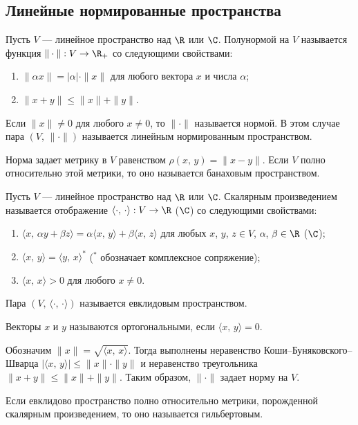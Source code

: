 \documentclass[a4paper
]{article}
\begin{document}
\subsection{Линейные нормированные пространства}
\begin{Def}
Пусть $V$ --- линейное пространство над $\R$ или $\C$. Полунормой
на $V$ называется функция $\|\cdot\|:V\rightarrow \R_+$ со
следующими свойствами:
\begin{enumerate}
\item $\|\alpha x\|=|\alpha|\cdot\|x\|$ для любого вектора $x$ и числа $\alpha$;
\item $\|x+y\|\le \|x\|+\|y\|$.
\end{enumerate}
Если $\|x\|\ne 0$ для любого $x\ne 0$, то $\|\cdot\|$ называется
нормой. В этом случае пара $(V, \, \|\cdot\|)$ называется линейным нормированным
пространством.
\end{Def}
Норма задает метрику в $V$ равенством $\rho(x, \, y)=\|x-y\|$.
Если $V$ полно относительно этой метрики, то оно называется
банаховым пространством. \par
\begin{Def}
Пусть $V$ --- линейное пространство над $\R$ или $\C$. Скалярным
произведением называется отображение $\langle\cdot, \, \cdot\rangle:
V\rightarrow \R$ ($\C$) со следующими свойствами:
\begin{enumerate}
\item $\langle x, \, \alpha y+\beta z\rangle=\alpha \langle x, \, y\rangle+
\beta\langle x, \, z\rangle$ для любых $x$, $y$, $z\in V$,
$\alpha$, $\beta\in \R$ ($\C$);
\item $\langle x, \, y\rangle=\langle y, \, x\rangle^*$ ($^*$ обозначает
комплексное сопряжение);
\item $\langle x, \, x\rangle >0$ для любого $x\ne 0$.
\end{enumerate}
Пара $(V, \, \langle\cdot, \, \cdot\rangle)$ называется евклидовым
пространством.
\end{Def}
Векторы $x$ и $y$ называются ортогональными, если $\langle x, \, y\rangle
=0$. \par
Обозначим $\|x\|=\sqrt{\langle x, \, x\rangle}$. Тогда выполнены
неравенство Коши--Буняковского--Шварца $|\langle x, \, y\rangle|
\le \|x\|\cdot\|y\|$ и неравенство треугольника $\|x+y\|\le \|x\|+\|y\|$.
Таким образом, $\|\cdot\|$ задает норму на $V$. \par
Если евклидово пространство полно относительно метрики, порожденной
скалярным произведением, то оно называется гильбертовым. \par
\end{document}
